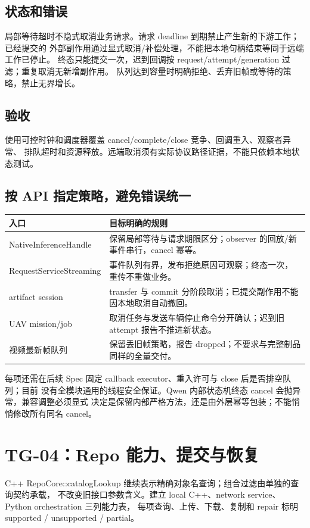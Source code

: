 \subsection{状态和错误}
局部等待超时不隐式取消业务请求。请求 deadline 到期禁止产生新的下游工作；已经提交的
外部副作用通过显式取消/补偿处理，不能把本地句柄结束等同于远端工作已停止。
终态只能提交一次，迟到回调按 request/attempt/generation 过滤；重复取消无新增副作用。
队列达到容量时明确拒绝、丢弃旧帧或等待的策略，禁止无界增长。

\subsection{验收}
使用可控时钟和调度器覆盖 cancel/complete/close 竞争、回调重入、观察者异常、
排队超时和资源释放。远端取消须有实际协议路径证据，不能只依赖本地状态测试。

\subsection{按 API 指定策略，避免错误统一}
\begin{tabularx}{\linewidth}{@{}p{44mm}X@{}}
\toprule
入口 & 目标明确的规则 \\
\midrule
NativeInferenceHandle & 保留局部等待与请求期限区分；observer 的回放/新事件串行，cancel 幂等。\\
RequestServiceStreaming & 事件队列有界，发布拒绝原因可观察；终态一次，重传不重做业务。\\
artifact session & transfer 与 commit 分阶段取消；已提交副作用不能因本地取消自动撤回。\\
UAV mission/job & 取消任务与发送车辆停止命令分开确认；迟到旧 attempt 报告不推进新状态。\\
视频最新帧队列 & 保留丢旧帧策略，报告 dropped；不要求与完整制品同样的全量交付。\\
\bottomrule
\end{tabularx}
每项还需在后续 Spec 固定 callback executor、重入许可与 close 后是否排空队列；目前
没有全模块通用的线程安全保证。Qwen 内部状态机终态 cancel 会抛异常，兼容调整必须显式
决定是保留内部严格方法，还是由外层幂等包装；不能悄悄修改所有同名 cancel。

\section{TG-04：Repo 能力、提交与恢复}
C++ RepoCore::catalogLookup 继续表示精确对象名查询；组合过滤由单独的查询契约承载，
不改变旧接口参数含义。建立 local C++、network service、Python orchestration 三列能力表，
每项查询、上传、下载、复制和 repair 标明 supported / unsupported / partial。

